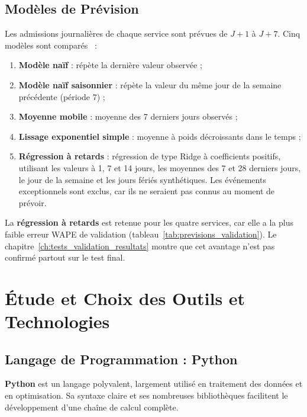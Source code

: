\subsection{Modèles de Prévision}
Les admissions journalières de chaque service sont prévues de $J+1$ à $J+7$. Cinq modèles sont comparés~\cite{hyndman2021} :
\begin{enumerate}
    \item \textbf{Modèle naïf} : répète la dernière valeur observée ;
    \item \textbf{Modèle naïf saisonnier} : répète la valeur du même jour de la semaine précédente (période 7) ;
    \item \textbf{Moyenne mobile} : moyenne des 7 derniers jours observés ;
    \item \textbf{Lissage exponentiel simple} : moyenne à poids décroissants dans le temps ;
    \item \textbf{Régression à retards} : régression de type Ridge à coefficients positifs, utilisant les valeurs à 1, 7 et 14 jours, les moyennes des 7 et 28 derniers jours, le jour de la semaine et les jours fériés synthétiques. Les événements exceptionnels sont exclus, car ils ne seraient pas connus au moment de prévoir.
\end{enumerate}

La \textbf{régression à retards} est retenue pour les quatre services, car elle a la plus faible erreur WAPE de validation (tableau~\ref{tab:previsions_validation}). Le chapitre~\ref{ch:tests_validation_resultats} montre que cet avantage n'est pas confirmé partout sur le test final.

\section{Étude et Choix des Outils et Technologies}

\subsection{Langage de Programmation : Python}

\textbf{Python} est un langage polyvalent, largement utilisé en traitement des données et en optimisation. Sa syntaxe claire et ses nombreuses bibliothèques facilitent le développement d'une chaîne de calcul complète.

